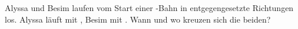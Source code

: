 Alyssa und Besim laufen vom Start einer \sBO-Bahn in entgegengesetzte Richtungen los. Alyssa läuft mit \vAlO, Besim mit \vBeO. Wann und wo kreuzen sich die beiden?
